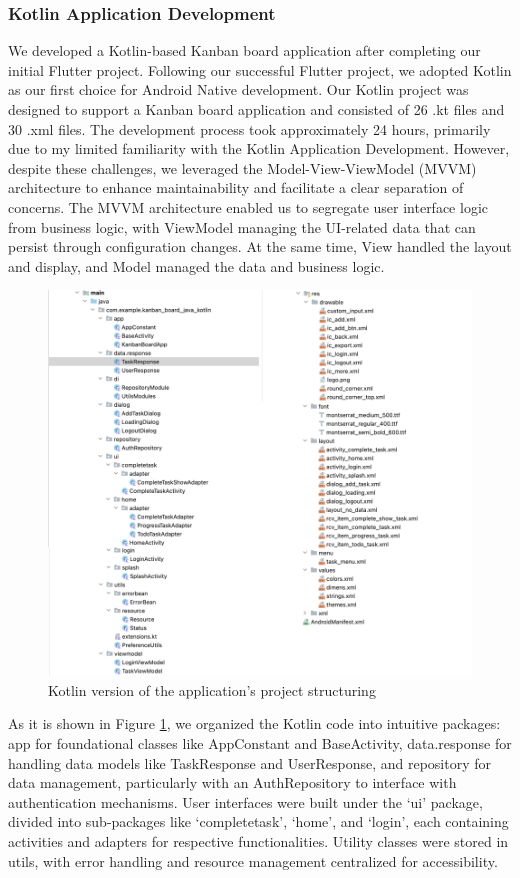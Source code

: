 \subsubsection{Kotlin Application Development} 
We developed a Kotlin-based Kanban board application after completing our initial Flutter project. Following our successful Flutter project, we adopted Kotlin as our first choice for Android Native development. Our Kotlin project was designed to support a Kanban board application and consisted of 26 .kt files and 30 .xml files. The development process took approximately 24 hours, primarily due to my limited familiarity with the Kotlin Application Development.
However, despite these challenges, we leveraged the Model-View-ViewModel (MVVM) architecture to enhance maintainability and facilitate a clear separation of concerns. The MVVM \cite{Sewak_2023} architecture enabled us to segregate user interface logic from business logic, with ViewModel managing the UI-related data that can persist through configuration changes. At the same time, View handled the layout and display, and Model managed the data and business logic.
\begin{figure}[htbp]
    \centering
    \includegraphics[scale = 0.8]{img/kotlin_project_struct.png}
    \caption{Kotlin version of the application’s project structuring}
    \label{fig:kotlin_project_struct}
\end{figure}
\par
As it is shown in Figure \ref*{fig:kotlin_project_struct}, we organized the Kotlin code into intuitive packages: app for foundational classes like AppConstant and BaseActivity, data.response for handling data models like TaskResponse and UserResponse, and repository for data management, particularly with an AuthRepository to interface with authentication mechanisms. User interfaces were built under the ‘ui’ package, divided into sub-packages like ‘completetask’, ‘home’, and ‘login’, each containing activities and adapters for respective functionalities. Utility classes were stored in utils, with error handling and resource management centralized for accessibility.

